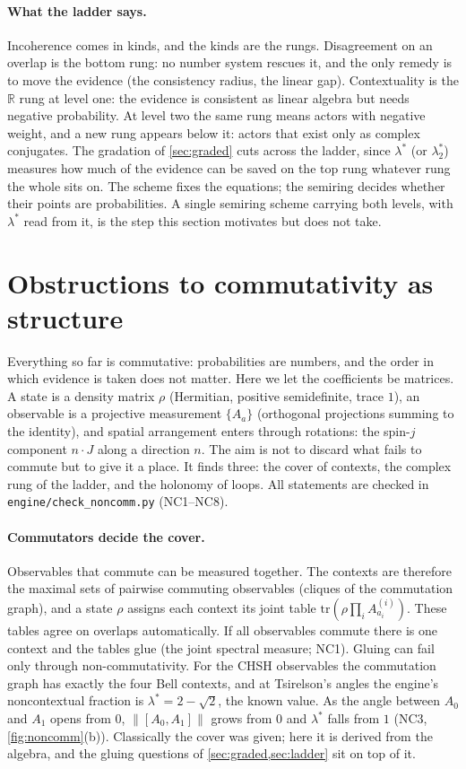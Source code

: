\documentclass[11pt]{article}
\theoremstyle{definition}\newtheorem{definition}[theorem]{Definition}\newtheorem{remark}[theorem]{Remark}\newtheorem{example}[theorem]{Example}
\newcommand{\R}{\mathbb R}
\begin{document}
\paragraph{What the ladder says.}
Incoherence comes in kinds, and the kinds are the rungs. Disagreement on an overlap is the bottom rung: no number system rescues it, and
the only remedy is to move the evidence (the consistency radius, the linear gap). Contextuality is the $\R$ rung at level one: the
evidence is consistent as linear algebra but needs negative probability. At level two the same rung means actors with negative weight,
and a new rung appears below it: actors that exist only as complex conjugates. The gradation of \cref{sec:graded} cuts across the ladder,
since $\lambda^*$ (or $\lambda^*_2$) measures how much of the evidence can be saved on the top rung whatever rung the whole sits on. The
scheme fixes the equations; the semiring decides whether their points are probabilities. A single semiring scheme carrying both levels, with
$\lambda^*$ read from it, is the step this section motivates but does not take.

\section{Obstructions to commutativity as structure}\label{sec:noncomm}

Everything so far is commutative: probabilities are numbers, and the order in which evidence is taken does not matter. Here we let the
coefficients be matrices. A state is a density matrix $\rho$ (Hermitian, positive semidefinite, trace $1$), an observable is a projective
measurement $\{A_a\}$ (orthogonal projections summing to the identity), and spatial arrangement enters through rotations: the spin-$j$
component $n\cdot J$ along a direction $n$. The aim is not to discard what fails to commute but to give it a place. It finds three:
the cover of contexts, the complex rung of the ladder, and the holonomy of loops. All statements are checked in
\texttt{engine/check\_noncomm.py} (NC1--NC8).

\paragraph{Commutators decide the cover.}
Observables that commute can be measured together. The contexts are therefore the maximal sets of pairwise commuting observables (cliques
of the commutation graph), and a state $\rho$ assigns each context its joint table $\mathrm{tr}(\rho\prod_iA^{(i)}_{a_i})$. These tables agree on
overlaps automatically. If all observables commute there is one context and the tables glue (the joint spectral measure; NC1). Gluing can
fail only through non-commutativity. For the CHSH observables the commutation graph has exactly the four Bell contexts, and at
Tsirelson's angles \cite{Tsirelson1980} the engine's noncontextual fraction is $\lambda^*=2-\sqrt2$, the known value. As the angle
between $A_0$ and $A_1$ opens from $0$, $\|[A_0,A_1]\|$ grows from $0$ and $\lambda^*$ falls from $1$ (NC3, \cref{fig:noncomm}(b)). Classically the
cover was given; here it is derived from the algebra, and the gluing questions of \cref{sec:graded,sec:ladder} sit on top of it.
\end{document}
